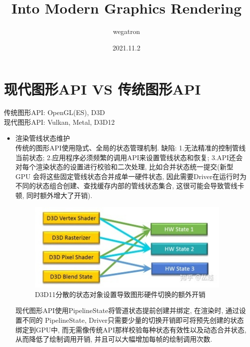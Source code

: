 \documentclass[UTF8]{ctexart}
\title{Into Modern Graphics Rendering}
\author{wegatron}
\date{2021.11.2}
\begin{document}
\maketitle

\section{现代图形API VS 传统图形API\cite{modernGraphicsAPI}}
传统图形API: OpenGL(ES), D3D\\
现代图形API: Vulkan, Metal, D3D12
\begin{itemize}
\item 渲染管线状态维护
  \\传统的图形API使用隐式、全局的状态管理机制. 缺陷: 1.无法精准的控制管线当前状态; 2.应用程序必须频繁的调用API来设置管线状态和恢复; 3.API还会对每个渲染状态的设置进行校验和二次处理, 比如合并状态统一提交(新型 GPU 会将这些固定管线状态合并成单一硬件状态, 因此需要Driver在运行时为不同的状态组合创建、查找缓存内部的管线状态集合, 这很可能会导致管线卡顿, 同时额外增大了开销).
  \begin{figure}[H]
    \includegraphics[width=10cm]{render_state_merge.jpg}
    \centering
    \caption{D3D11分散的状态对象设置导致图形硬件切换的额外开销}
    \label{fig:gpu_rendering_pipline_state_merge}
  \end{figure}

  现代图形API使用PipelineState将管道状态提前创建并绑定, 在渲染时, 通过设置不同的 PipelineState, Driver只需要少量的切换开销即可将预先创建的状态绑定到GPU中, 而无需像传统API那样校验每种状态有效性以及动态合并状态, 从而降低了绘制调用开销, 并且可以大幅增加每帧的绘制调用次数.


\end{itemize}
\end{document}
